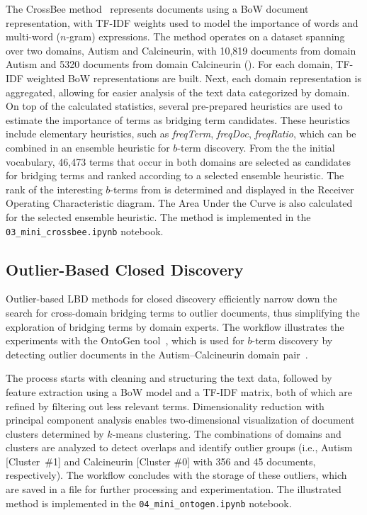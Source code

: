 \documentclass[runningheads]{llncs}
\begin{document}
The CrossBee method~\cite{jursic2012cross} represents documents using a BoW document representation, with TF-IDF weights used to model the importance of words and multi-word ($n$-gram) expressions. The method operates on a dataset spanning over two domains, Autism and Calcineurin, with {10,819} documents from domain Autism and 5320 documents from domain Calcineurin (). For each domain, TF-IDF weighted BoW representations are built. Next, each domain representation is aggregated, allowing for easier analysis of the text data categorized by domain. On top of the calculated statistics, several pre-prepared heuristics are used to estimate the importance of terms as bridging term candidates. These heuristics include elementary heuristics, such as \textit{freqTerm}, \textit{freqDoc}, \textit{freqRatio}, which can be combined in an ensemble heuristic for $b$-term discovery. From the the initial vocabulary, {46,473} terms that occur in both domains are selected as candidates for bridging terms and ranked according to a selected ensemble heuristic. The rank of the interesting $b$-terms from  is determined and displayed in the Receiver Operating Characteristic diagram. The Area Under the Curve is also calculated for the selected ensemble heuristic. The method is implemented in the \texttt{03\_mini\_crossbee.ipynb} notebook.

\subsection{Outlier-Based Closed Discovery}
\label{sec:outlier_closed}

Outlier-based LBD methods for closed discovery efficiently narrow down the search for cross-domain bridging terms to outlier documents, thus simplifying the exploration of bridging terms by domain experts. The workflow illustrates the experiments with the OntoGen tool~\cite{cestnik2017reducing}, which is used for $b$-term discovery by detecting outlier documents in the Autism--Calcineurin domain pair~\cite{petric2012bison,sluban2012exploring}.

The process starts with cleaning and structuring the text data, followed by feature extraction using a BoW model and a TF-IDF matrix, both of which are refined by filtering out less relevant terms. Dimensionality reduction with principal component analysis enables two-dimensional visualization of document clusters determined by $k$-means clustering. The combinations of domains and clusters are analyzed to detect overlaps and identify outlier groups (i.e., Autism [Cluster~\#1] and Calcineurin [Cluster \#0] with 356 and 45 documents, respectively). The workflow concludes with the storage of these outliers, which are saved in a file for further processing and experimentation. The illustrated method is implemented in the \texttt{04\_mini\_ontogen.ipynb} notebook.
       
\end{document}

